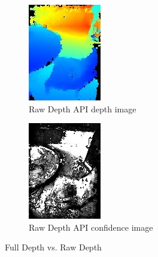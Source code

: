 \begin{figure}[ht!]
    \begin{subfigure}[b]{0.4\textwidth}
        \centering
        \includegraphics[width=0.8\linewidth]{images/depth_raw-depth-image}
        \caption{Raw Depth API depth image}
    \end{subfigure}%
    \begin{subfigure}[b]{0.4\textwidth}
        \centering
        \includegraphics[width=0.8\linewidth]{images/depth_raw-depth-confidence-image}
        \caption{Raw Depth API confidence image}
    \end{subfigure}%

    \caption{Full Depth vs. Raw Depth}
    \label{fig:depth-api-images}
\end{figure}
